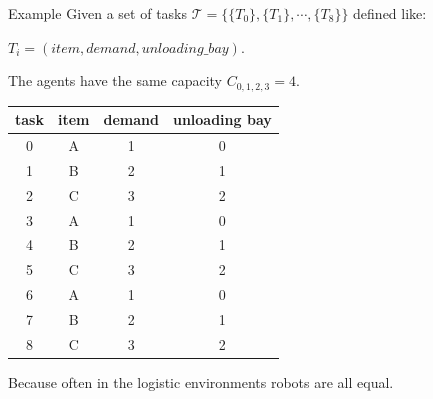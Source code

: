     \begin{frame}[fragile]{Example}
        Given a set of tasks $\mathcal{T}= \{  \{T_0\}, \{T_1\}, \cdots, \{T_8\} \}$ defined like:

        ${T_i=(item, demand, unloading\_bay)}$.
        
        The agents have the same capacity $C_{0,1,2,3} = 4$.
                    \begin{center}
                      \begin{tabular}{|c|c|c|c|} \hline
                        \textbf{task} & \textbf{item} & \textbf{demand} & \textbf{unloading bay} \\ \hline
                        0    & A    & 1      & 0             \\
                        1    & B    & 2      & 1             \\
                        2    & C    & 3      & 2             \\
                        3    & A    & 1      & 0             \\
                        4    & B    & 2      & 1             \\
                        5    & C    & 3      & 2             \\
                        6    & A    & 1      & 0             \\
                        7    & B    & 2      & 1             \\
                        8    & C    & 3      & 2             \\ \hline       
                      \end{tabular} 
                    \end{center}
                    Because often in the logistic environments robots are all equal. 
            
    \end{frame}

